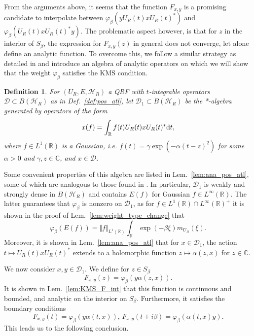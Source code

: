 \documentclass[sn-mathphys-num]{sn-jnl}%
\newcommand{\CC}{\mathbb{C}}
\newcommand{\RR}{\mathbb{R}}
\newcommand{\HH}{\mathcal{H}}
\newcommand{\diff}{\textup{d}}
\numberwithin{equation}{section}
\theoremstyle{thmstyleone}%
\theoremstyle{thmstyletwo}%
\theoremstyle{thmstylethree}%
\newtheorem{definition}[theorem]{Definition}%
\begin{document}
From the arguments above, it seems that the function $F_{x,y}$ is a promising candidate to interpolate between $\varphi_\beta(yU_R(t)xU_R(t)^*)$ and $\varphi_\beta(U_R(t)xU_R(t)^*y)$. The problematic aspect however, is that for $z$ in the interior of $S_\beta$, the expression for $F_{x,y}(z)$ in general does not converge, let alone define an analytic function. To overcome this, we follow a similar strategy as detailed in \cite{Buchholz:1988fk} and introduce an algebra of analytic operators on which we will show that the weight $\varphi_\beta$ satisfies the KMS condition.
\begin{definition}
    \label{def:ana_pos_atl}
    For $(U_R,E,\HH_R)$ a QRF with $t$-integrable operators $\mathcal{D}\subset B(\HH_R)$ as in Def.\ \ref{def:pos_atl}, let $\mathcal{D}_1\subset B(\HH_R)$ be the *-algebra generated by operators of the form
    \begin{equation}
        \label{eq:op_smear}
        x(f)=\int_{\RR}f(t)U_R(t)xU_R(t)^*\diff t,
    \end{equation}
    where $f\in L^1(\RR)$ is a Gaussian, i.e. $f(t)=\gamma\exp(-\alpha (t-z)^2)$ for some $\alpha>0$ and $\gamma,z\in\CC$, and $x\in \mathcal{D}$.
\end{definition}
Some convenient properties of this algebra are listed in Lem.\ \ref{lem:ana_pos_atl}, some of which are analogous to those found in \cite[Lem.\ 3.2]{Buchholz:1988fk}. In particular, $\mathcal{D}_1$ is weakly and strongly dense in $B(\HH_R)$ and contains $E(f)$ for Gaussian $f\in L^\infty(\RR)$. The latter guarantees that $\varphi_\beta$ is nonzero on $\mathcal{D}_1$, as for $f\in L^1(\RR)\cap L^\infty(\RR)^+$ it is shown in the proof of Lem.\ \ref{lem:weight_type_change} that
\begin{equation}
    \varphi_\beta(E(f))=\Vert f\Vert_{L^1(\RR)}\int_\RR\exp(-\beta\xi)m_{U_R}(\xi).
\end{equation}
Moreover, it is shown in Lem.\ \ref{lem:ana_pos_atl} that for $x\in\mathcal{D}_1$, the action $t\mapsto U_R(t)x U_R(t)^*$ extends to a holomorphic function $z\mapsto \alpha(z,x)$ for $z\in\CC$.

We now consider $x,y\in\mathcal{D}_1$. We define for $z\in S_\beta$
\begin{equation}
    F_{x,y}(z)=\varphi_\beta(y\alpha(z,x)).
\end{equation}
It is shown in Lem.\ \ref{lem:KMS_F_int} that this function is continuous and bounded, and analytic on the interior on $S_\beta$. Furthermore, it satisfies the boundary conditions
\begin{equation}
    F_{x,y}(t)=\varphi_\beta(y\alpha(t,x)),\, F_{x,y}(t+i\beta)=\varphi_\beta(\alpha(t,x)y).
\end{equation}
This leads us to the following conclusion.
\end{document}
